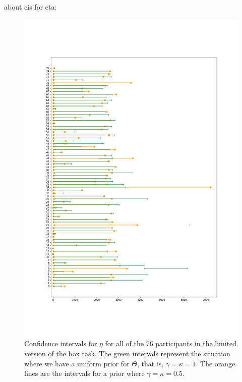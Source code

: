 about cis for eta:
\begin{figure}
    \centering
    \includegraphics[scale=0.37]{pictures/Sensitivity/ci_lim_eta_zoomed.png}
    \caption[CIs for $\eta$ for all participants with two different priors, limited]{Confidence intervals for $\eta$ for all of the 76 participants in the limited version of the box task. The green intervals represent the situation where we have a uniform prior for $\Theta$, that is, $\gamma=\kappa=1$. The orange lines are the intervals for a prior where $\gamma=\kappa=0.5$.}
    \label{fig:sensitivity_ci_lim_eta}
\end{figure}